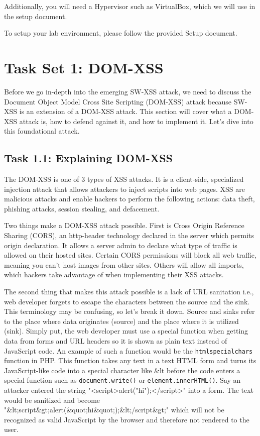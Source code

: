 \documentclass[letterpaper,12pt]{report}
\newcounter{taskset}
\newcounter{action}[taskset]
\begin{document}
Additionally, you will need a Hypervisor such as VirtualBox, which we will use in the setup document.

To setup your lab environment, please follow the provided Setup document.

\section*{Task Set 1: DOM-XSS}\label{sec:Task 1: DOMXSS}

Before we go in-depth into the emerging SW-XSS attack, we need to discuss the Document Object Model Cross Site Scripting (DOM-XSS) attack because SW-XSS is an extension of a DOM-XSS attack. This section will cover what a DOM-XSS attack is, how to defend against it, and how to implement it. Let's dive into this foundational attack.

\subsection*{Task 1.1: Explaining DOM-XSS}

The DOM-XSS is one of 3 types of XSS attacks. It is a client-side, specialized injection attack that allows attackers to inject scripts into web pages. XSS are malicious attacks and enable hackers to perform the following actions: data theft, phishing attacks, session stealing, and defacement.

Two things make a DOM-XSS attack possible. First is Cross Origin Reference Sharing (CORS), an http-header technology declared in the server which permits origin declaration. It allows a server admin to declare what type of traffic is allowed on their hosted sites. Certain CORS permissions will block all web traffic, meaning you can't host images from other sites. Others will allow all imports, which hackers take advantage of when implementing their XSS attacks.

The second thing that makes this attack possible is a lack of URL sanitation i.e., web developer forgets to escape the characters between the source and the sink. This terminology may be confusing, so let's break it down. Source and sinks refer to the place where data originates (source) and the place where it is utilized (sink). Simply put, the web developer must use a special function when getting data from forms and URL headers so it is shown as plain text instead of JavaScript code. An example of such a function would be the \texttt{htmlspecialchars} function in PHP. This function takes any text in a text HTML form and turns its JavaScript-like code into a special character like \&lt before the code enters a special function such as \texttt{document.write()} or \texttt{element.innerHTML()}. Say an attacker entered the string "<script>alert("hi");</script>" into a form. The text would be sanitized and become "\&lt;script\&gt;alert(\&quot;hi\&quot;);\&lt;/script\&gt;" which will not be recognized as valid JavaScript by the browser and therefore not rendered to the user.
\end{document}
